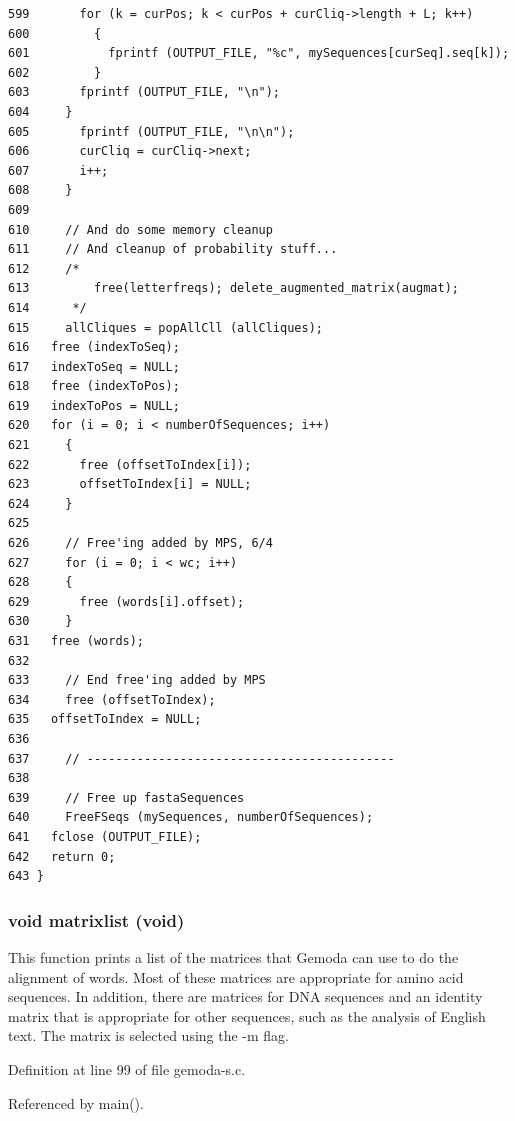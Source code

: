\begin{verbatim}
599       for (k = curPos; k < curPos + curCliq->length + L; k++)
600         {
601           fprintf (OUTPUT_FILE, "%c", mySequences[curSeq].seq[k]);
602         }
603       fprintf (OUTPUT_FILE, "\n");
604     }
605       fprintf (OUTPUT_FILE, "\n\n");
606       curCliq = curCliq->next;
607       i++;
608     }
609   
610     // And do some memory cleanup
611     // And cleanup of probability stuff...
612     /*
613         free(letterfreqs); delete_augmented_matrix(augmat); 
614      */ 
615     allCliques = popAllCll (allCliques);
616   free (indexToSeq);
617   indexToSeq = NULL;
618   free (indexToPos);
619   indexToPos = NULL;
620   for (i = 0; i < numberOfSequences; i++)
621     {
622       free (offsetToIndex[i]);
623       offsetToIndex[i] = NULL;
624     }
625   
626     // Free'ing added by MPS, 6/4
627     for (i = 0; i < wc; i++)
628     {
629       free (words[i].offset);
630     }
631   free (words);
632   
633     // End free'ing added by MPS
634     free (offsetToIndex);
635   offsetToIndex = NULL;
636   
637     // -------------------------------------------
638     
639     // Free up fastaSequences
640     FreeFSeqs (mySequences, numberOfSequences);
641   fclose (OUTPUT_FILE);
642   return 0;
643 }
\end{verbatim}
\normalsize 


\hypertarget{gemoda-s_8c_a1}{
\subsubsection[matrixlist]{\setlength{\rightskip}{0pt plus 5cm}void matrixlist (void)}}
\label{gemoda-s_8c_a1}


This function prints a list of the matrices that Gemoda can use to do the alignment of words. Most of these matrices are appropriate for amino acid sequences. In addition, there are matrices for DNA sequences and an identity matrix that is appropriate for other sequences, such as the analysis of English text. The matrix is selected using the -m flag.

Definition at line 99 of file gemoda-s.c.

Referenced by main().

